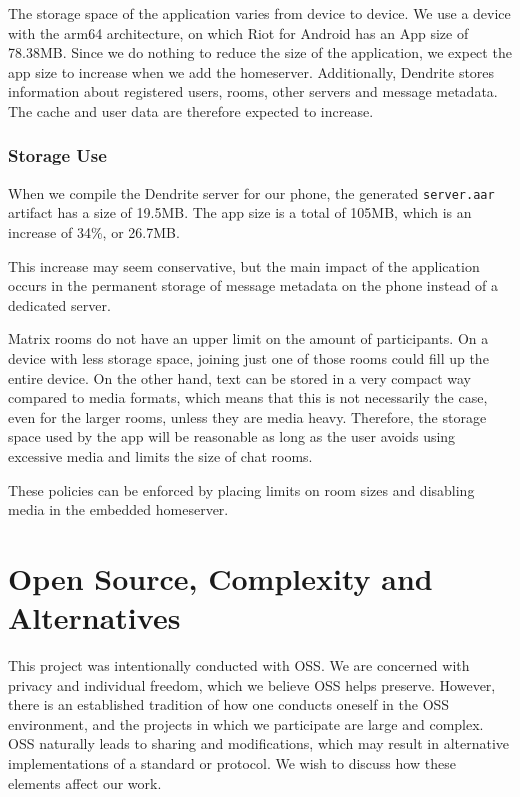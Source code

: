 The storage space of the application varies from device to device.
We use a device with the arm64 architecture, on which Riot for Android has an App size of 78.38MB\@.
Since we do nothing to reduce the size of the application, we expect the app size to increase when we add the homeserver.
Additionally, Dendrite stores information about registered users, rooms, other servers and message metadata.
The cache and user data are therefore expected to increase.

\subsection{Storage Use}\label{sec:storage_use}
When we compile the Dendrite server for our phone, the generated \texttt{server.aar} artifact has a size of 19.5MB\@.
The app size is a total of 105MB\@, which is an increase of 34\%, or 26.7MB\@.

This increase may seem conservative, but the main impact of the application occurs in the permanent storage of message metadata on the phone instead of a dedicated server.

Matrix rooms do not have an upper limit on the amount of participants. On a device with less storage space, joining just one of those rooms could fill up the entire device.
On the other hand, text can be stored in a very compact way compared to media formats, which means that this is not necessarily the case, even for the larger rooms, unless they are media heavy.
Therefore, the storage space used by the app will be reasonable as long as the user avoids using excessive media and limits the size of chat rooms.

These policies can be enforced by placing limits on room sizes and disabling media in the embedded homeserver.


\chapter{Open Source, Complexity and Alternatives}\label{chp:open_source_complexity_alternatives}
This project was intentionally conducted with \ac{OSS}.
We are concerned with privacy and individual freedom, which we believe \ac{OSS} helps preserve.
However, there is an established tradition of how one conducts oneself in the \ac{OSS} environment, and the projects in which we participate are large and complex.
\ac{OSS} naturally leads to sharing and modifications, which may result in alternative implementations of a standard or protocol.
We wish to discuss how these elements affect our work.

